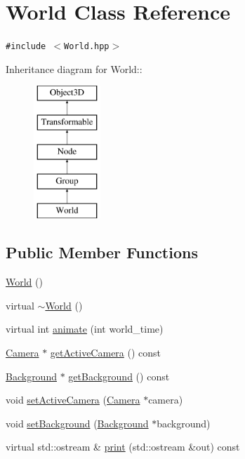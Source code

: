 \hypertarget{classm3g_1_1World}{
\section{World Class Reference}
\label{classm3g_1_1World}
}
{\tt \#include $<$World.hpp$>$}

Inheritance diagram for World::\begin{figure}[H]
\begin{center}
\leavevmode
\includegraphics[height=5cm]{classm3g_1_1World}
\end{center}
\end{figure}
\subsection*{Public Member Functions}
\begin{CompactItemize}
\item 
\hyperlink{classm3g_1_1World_75e827b8787e735882f60c266d58e02e}{World} ()
\item 
virtual \hyperlink{classm3g_1_1World_bd170ded455f0b2273c1fe06da6ea0cb}{$\sim$World} ()
\item 
virtual int \hyperlink{classm3g_1_1World_8aad1ceab4c2a03609c8a42324ce484d}{animate} (int world\_\-time)
\item 
\hyperlink{classm3g_1_1Camera}{Camera} $\ast$ \hyperlink{classm3g_1_1World_812e01ec4fd0fd872b0ca5ea6a30b2f6}{getActiveCamera} () const 
\item 
\hyperlink{classm3g_1_1Background}{Background} $\ast$ \hyperlink{classm3g_1_1World_fb10ab7fd2ad14b7b1d49caf129670e0}{getBackground} () const 
\item 
void \hyperlink{classm3g_1_1World_dd9a82b335e8521592ad410c662a5cfd}{setActiveCamera} (\hyperlink{classm3g_1_1Camera}{Camera} $\ast$camera)
\item 
void \hyperlink{classm3g_1_1World_6193765c76d6dc0450f264918ebe7e1c}{setBackground} (\hyperlink{classm3g_1_1Background}{Background} $\ast$background)
\item 
virtual std::ostream \& \hyperlink{classm3g_1_1World_6fea17fa1532df3794f8cb39cb4f911f}{print} (std::ostream \&out) const 
\end{CompactItemize}

